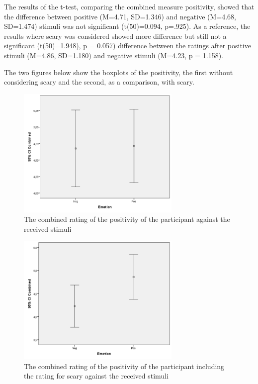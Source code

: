 \documentclass[Results.tex]{subfiles}
\begin{document}
The results of the t-test, comparing the combined measure positivity, showed that the difference between positive (M=4.71, SD=1.346) and negative (M=4.68, SD=1.474) stimuli was not significant (t(50)=0.094, p=.925). As a reference, the results where scary was considered showed more difference but still not a significant (t(50)=1.948), p = 0.057) difference between the ratings after positive stimuli (M=4.86, SD=1.180) and negative stimuli (M=4.23, p = 1.158).

The two figures below show the boxplots of the positivity, the first without considering scary and the second, as a comparison, with scary.

\begin{figure}[H]
	\centering
		\includegraphics[width=0.70\textwidth]{Section_1/Figures/Boxplot_emo1.png}
	\caption{The combined rating of the positivity of the participant against the received stimuli}
	\label{fig:Boxplot_combined}
\end{figure}	

\begin{figure}[H]
	\centering
		\includegraphics[width=0.70\textwidth]{Section_1/Figures/Boxplot_emo2.png}
	\caption{The combined rating of the positivity of the participant including the rating for scary against the received stimuli}
	\label{fig:Boxplot_combined2}
\end{figure}	
\end{document}
